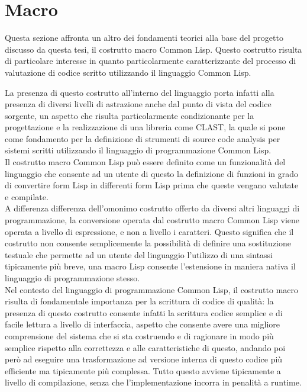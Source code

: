 \section{Macro}
\label{macro}

Questa sezione affronta un altro dei fondamenti teorici alla base del progetto
discusso da questa tesi, il costrutto macro Common Lisp. Questo costrutto
risulta di particolare interesse in quanto particolarmente caratterizzante del
processo di valutazione di codice scritto utilizzando il linguaggio Common Lisp.

La presenza di questo costrutto all'interno del linguaggio porta infatti alla
presenza di diversi livelli di astrazione anche dal punto di vista del codice
sorgente, un aspetto che risulta particolarmente condizionante per la
progettazione e la realizzazione di una libreria come CLAST, la quale si pone
come fondamento per la definizione di strumenti di source code analysis per
sistemi scritti utilizzando il linguaggio di programmazione Common Lisp.\\

Il costrutto macro Common Lisp può essere definito come un funzionalità del
linguaggio che consente ad un utente di questo la definizione di funzioni in
grado di convertire form Lisp in differenti form Lisp prima che queste vengano
valutate e compilate.\\

A differenza differenza dell'omonimo costrutto offerto da diversi altri
linguaggi di programmazione, la conversione operata dal costrutto macro Common
Lisp viene operata a livello di espressione, e non a livello i caratteri. Questo
significa che il costrutto non consente semplicemente la possibilità di definire
una sostituzione testuale che permette ad un utente del linguaggio l’utilizzo di
una sintassi tipicamente più breve, una macro Lisp consente l'estensione in
maniera nativa il linguaggio di programmazione stesso.\\

Nel contesto del linguaggio di programmazione Common Lisp, il costrutto macro
risulta di fondamentale importanza per la scrittura di codice di qualità: la
presenza di questo costrutto consente infatti la scrittura codice semplice e di
facile lettura a livello di interfaccia, aspetto che consente avere una migliore
comprensione del sistema che si sta costruendo e di ragionare in modo più
semplice rispetto alla correttezza e alle caratteristiche di questo, andando poi
però ad eseguire una trasformazione ad versione interna di questo codice più
efficiente ma tipicamente più complessa. Tutto questo avviene tipicamente a
livello di compilazione, senza che l'implementazione incorra in penalità a
runtime.\\


